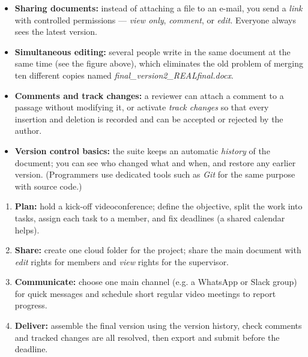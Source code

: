 \documentclass[11pt]{article}
\begin{document}
\begin{itemize}
\item \textbf{Sharing documents:} instead of attaching a file to an e-mail, you send a \emph{link} with controlled permissions — \emph{view only}, \emph{comment}, or \emph{edit}. Everyone always sees the latest version.
\item \textbf{Simultaneous editing:} several people write in the same document at the same time (see the figure above), which eliminates the old problem of merging ten different copies named \emph{final\_version2\_REALfinal.docx}.
\item \textbf{Comments and track changes:} a reviewer can attach a comment to a passage without modifying it, or activate \emph{track changes} so that every insertion and deletion is recorded and can be accepted or rejected by the author.
\item \textbf{Version control basics:} the suite keeps an automatic \emph{history} of the document; you can see who changed what and when, and restore any earlier version. (Programmers use dedicated tools such as \emph{Git} for the same purpose with source code.)
\end{itemize}

\begin{methode}
\begin{enumerate}
\item \textbf{Plan:} hold a kick-off videoconference; define the objective, split the work into tasks, assign each task to a member, and fix deadlines (a shared calendar helps).
\item \textbf{Share:} create one cloud folder for the project; share the main document with \emph{edit} rights for members and \emph{view} rights for the supervisor.
\item \textbf{Communicate:} choose one main channel (e.g. a WhatsApp or Slack group) for quick messages and schedule short regular video meetings to report progress.
\item \textbf{Deliver:} assemble the final version using the version history, check comments and tracked changes are all resolved, then export and submit before the deadline.
\end{enumerate}
\end{methode}
\end{document}
